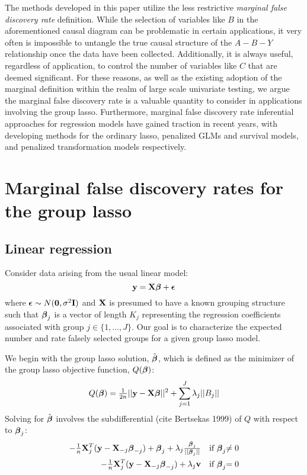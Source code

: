 The methods developed in this paper utilize the less restrictive \textit{marginal false discovery rate} definition.  While the selection of variables like $B$ in the aforementioned causal diagram can be problematic in certain applications, it very often is impossible to untangle the true causal structure of the $A-B-Y$ relationship once the data have been collected.  Additionally, it is always useful, regardless of application, to control the number of variables like $C$ that are deemed significant.  For these reasons, as well as the existing adoption of the marginal definition within the realm of large scale univariate testing, we argue the marginal false discovery rate is a valuable quantity to consider in applications involving the group lasso.  Furthermore, marginal false discovery rate inferential approaches for regression models have gained traction in recent years, with \citet{Breheny2019, Miller2019, Liang2021} developing methods for the ordinary lasso, penalized GLMs and survival models, and penalized transformation models respectively.

\section{Marginal false discovery rates for the group lasso}

\subsection{Linear regression}

Consider data arising from the usual linear model:
\begin{equation}
\mathbf{y} = \mathbf{X}\boldsymbol{\beta} + \boldsymbol{\epsilon}
\end{equation}
where $\boldsymbol{\epsilon} \sim N(\mathbf{0}, \sigma^2\mathbf{I})$ and $\mathbf{X}$ is presumed to have a known grouping structure such that $\boldsymbol{\beta}_j$ is a vector of length $K_j$ representing the regression coefficients associated with group $j \in \{1, \ldots, J\}$.  Our goal is to characterize the expected number and rate falsely selected groups for a given group lasso model.

We begin with the group lasso solution, $\hat{\boldsymbol{\beta}}$, which is defined as the minimizer of the group lasso objective function, $Q(\boldsymbol{\beta})$:
\begin{equation}
Q(\boldsymbol{\beta}) = \tfrac{1}{2n}||\mathbf{y} - \mathbf{X}\boldsymbol{\beta}||^2 + \sum_{j = 1}^{J}\lambda_j ||B_j||
\end{equation}
Solving for $\hat{\boldsymbol{\beta}}$ involves the subdifferential (cite Bertsekas 1999) of $Q$ with respect to $\boldsymbol{\beta}_j$:
\begin{equation}
  \label{eq:kkt}
  \begin{alignedat}{2}
  -\tfrac{1}{n}\mathbf{X}_j^T(\mathbf{y} - \mathbf{X}_{-j}\boldsymbol{\beta}_{-j}) + \boldsymbol{\beta}_j + \lambda_j\tfrac{\boldsymbol{\beta}_j}{||\boldsymbol{\beta}_j||}  &\quad \text{if } \boldsymbol{\beta}_j &\neq 0 \\
  -\tfrac{1}{n}\mathbf{X}_j^T(\mathbf{y} - \mathbf{X}_{-j}\boldsymbol{\beta}_{-j}) + \lambda_j\mathbf{v}  &\quad \text{if }  \boldsymbol{\beta}_j &= 0
  \end{alignedat}
\end{equation}

